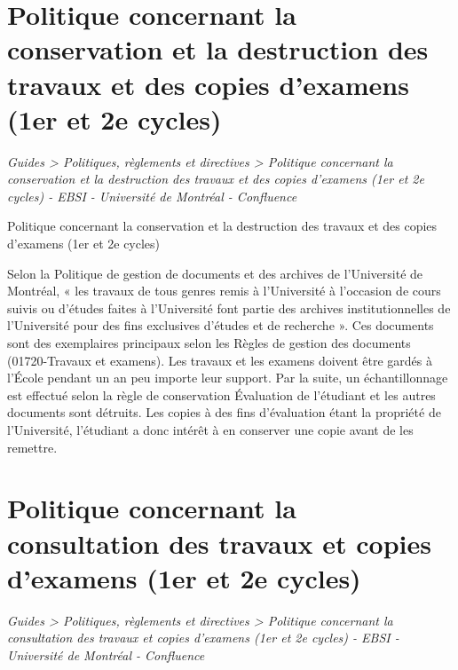 \documentclass [12 pt]{article}
\begin{document}
        
    
    
        \newpage
        \section {
        Politique concernant la conservation et la destruction des travaux et des copies
            d'examens (1er et 2e cycles)
        }
        
        
        
        \textit{
        Guides > Politiques, règlements et directives > Politique concernant la
            conservation et la destruction des travaux et des copies d'examens (1er et 2e
            cycles) - EBSI - Université de Montréal - Confluence
        }
    
        Politique concernant la conservation et la destruction des travaux et des copies
            d'examens (1er et 2e cycles)
        
            Selon la Politique de gestion de documents et des archives de l'Université de
                Montréal, « les travaux de tous genres remis à l'Université à l'occasion de cours
                suivis ou d'études faites à l'Université font partie des archives institutionnelles
                de l'Université pour des fins exclusives d'études et de recherche ». Ces documents
                sont des exemplaires principaux selon les Règles de gestion des documents
                (01720-Travaux et examens). Les travaux et les examens doivent être gardés à l'École
                pendant un an peu importe leur support. Par la suite, un échantillonnage est
                effectué selon la règle de conservation Évaluation de l'étudiant et les autres
                documents sont détruits.
            Les copies à des fins d'évaluation étant la propriété de l'Université, l'étudiant a
                donc intérêt à en conserver une copie avant de les remettre.
        
    
    
        \newpage
        \section {
        Politique concernant la consultation des travaux et copies d'examens (1er et 2e
            cycles)
        }
        
        
        
        \textit{
        Guides > Politiques, règlements et directives > Politique concernant la
            consultation des travaux et copies d'examens (1er et 2e cycles) - EBSI - Université
            de Montréal - Confluence
        }
    
\end{document}
